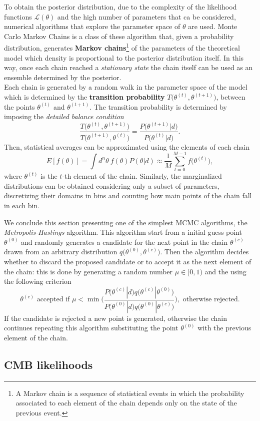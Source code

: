 To obtain the posterior distribution, due to the complexity of the likelihood functions $\mathcal L(\theta)$ and the high number of parameters that ca be considered, numerical algorithms that explore the parameter space of $\theta$ are used. Monte Carlo Markov Chains is a class of these algorithm that, given a probability distribution, generates \textbf{Markov chains}\footnote{A Markov chain is a sequence of statistical events in which the probability associated to each element of the chain depends only on the state of the previous event.} of the parameters of the theoretical model which density is proportional to the posterior distribution itself. In this way, once each chain reached a \emph{stationary state} the chain itself can be used as an ensemble determined by the posterior.\\
Each chain is generated by a random walk in the parameter space of the model which is determined by the \textbf{transition probability} $T\big(\theta^{(t)},\theta^{(t+1)}\big)$, between the points $\theta^{(t)}$ and $\theta^{(t+1)}$. The transition probability is determined by imposing the \emph{detailed balance condition}
$$\frac{T\big(\theta^{(t)},\theta^{(t+1)}\big)}{T\big(\theta^{(t+1)},\theta^{(t)}\big)}=\frac{P\big(\theta^{(t+1)}|d\big)}{P\big(\theta^{(t)}|d\big)}.$$
Then, statistical averages can be approximated using the elements of each chain
$$E[f(\theta)]=\int d^n\theta\ f(\theta)P(\theta|d)\approx\frac1M\sum_{t=0}^{M-1}f\big(\theta^{(t)}\big),$$
where $\theta^{(t)}$ is the $t$-th element of the chain. Similarly, the marginalized distributions can be obtained considering only a subset of parameters, discretizing their domains in bins and counting how main points of the chain fall in each bin.

We conclude this section presenting one of the simplest MCMC algorithms, the \emph{Metropolis-Hastings} algorithm. This algorithm start from a initial guess point $\theta^{(0)}$ and randomly generates a candidate for the next point in the chain $\theta^{(c)}$ drawn from an arbitrary distribution $q\big(\theta^{(0)},\theta^{(c)}\big)$. Then the algorithm decides whether to discard the proposed candidate or to accept it as the next element of the chain: this is done by generating a random number $\mu\in[0,1)$ and the using the following criterion
\begin{equation}
    \theta^{(c)}\text{ accepted if }\mu<\min\Bigg(\frac{P\big(\theta^{(c)}|d\big)q\big(\theta^{(c)}|\theta^{(0)}\big)}{P\big(\theta^{(0)}|d\big)q\big(\theta^{(0)}|\theta^{(c)}\big)}\Bigg),\text{ otherwise rejected.}
\end{equation}
If the candidate is rejected a new point is generated, otherwise the chain continues repeating this algorithm substituting the point $\theta^{(0)}$ with the previous element of the chain.
\subsection{CMB likelihoods}



